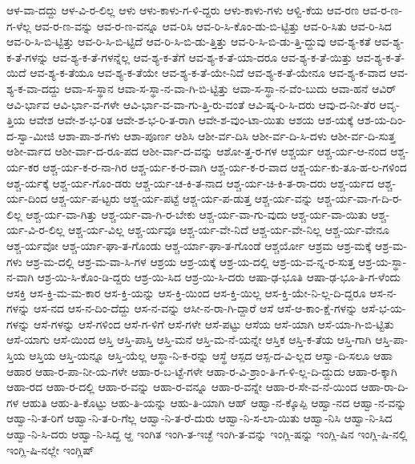 {ಆಳ-ವಾ-ದದ್ದು
ಆಳ-ವಿ-ರ-ಲಿಲ್ಲ
ಆಳು
ಆಳು-ಕಾಳು-ಗ-ಳಿ-ದ್ದರು
ಆಳು-ಕಾಳು-ಗಳು
ಆಳ್ವಿ-ಕೆಯ
ಆವ-ರಣ
ಆವ-ರ-ಣ-ಗ-ಳೆಲ್ಲ
ಆವ-ರ-ಣ-ವನ್ನು
ಆವ-ರ-ಣ-ವನ್ನೂ
ಆವ-ರಿಸಿ
ಆವ-ರಿ-ಸಿ-ಕೊಂ-ಡು-ಬಿ-ಟ್ಟಿತ್ತು
ಆವ-ರಿ-ಸಿತು
ಆವ-ರಿ-ಸಿದ
ಆವ-ರಿ-ಸಿ-ಬಿ-ಟ್ಟಿತ್ತು
ಆವ-ರಿ-ಸಿ-ಬಿ-ಟ್ಟಿದೆ
ಆವ-ರಿ-ಸಿ-ಬಿ-ಡು-ತ್ತಿತ್ತು
ಆವ-ರಿ-ಸಿ-ಬಿ-ಡು-ತ್ತಿ-ದ್ದುವು
ಆವ-ಶ್ಯ-ಕತೆ
ಆವ-ಶ್ಯ-ಕ-ತೆ-ಗಳನ್ನು
ಆವ-ಶ್ಯ-ಕ-ತೆ-ಗಳನ್ನೆಲ್ಲ
ಆವ-ಶ್ಯ-ಕ-ತೆಗೆ
ಆವ-ಶ್ಯ-ಕ-ತೆ-ಯಾ-ದರೂ
ಆವ-ಶ್ಯ-ಕ-ತೆ-ಯಿತ್ತು
ಆವ-ಶ್ಯ-ಕ-ತೆ-ಯಿದೆ
ಆವ-ಶ್ಯ-ಕ-ತೆಯೂ
ಆವ-ಶ್ಯ-ಕ-ತೆಯೇ
ಆವ-ಶ್ಯ-ಕ-ತೆ-ಯೇ-ನಿದೆ
ಆವ-ಶ್ಯ-ಕ-ತೆ-ಯೇನೂ
ಆವ-ಶ್ಯ-ಕ-ವಾದ
ಆವ-ಶ್ಯ-ಕ-ವಾ-ದದ್ದು
ಆವಾ-ಸ-ಸ್ಥಾನ
ಆವಾ-ಸ-ಸ್ಥಾ-ನ-ವಾ-ಗಿ-ಬಿ-ಟ್ಟಿತ್ತು
ಆವಾ-ಸ-ಸ್ಥಾ-ನ-ವೆಂ-ಬುದು
ಆವಾ-ಹನೆ
ಆವಿರ್
ಆವಿ-ರ್ಭಾವ
ಆವಿ-ರ್ಭಾ-ವ-ಗಳೇ
ಆವಿ-ರ್ಭಾ-ವ-ವಾ-ಗು-ತ್ತಿ-ರು-ವಂತೆ
ಆವಿ-ಷ್ಕ-ರಿ-ಸಿ-ದರು
ಆವು-ದ-ನೀ-ತೆರ
ಆವೃ-ತ್ತಿಯ
ಆವೇಶ
ಆವೇ-ಶ-ಭ-ರಿತ
ಆವೇ-ಶ-ಭ-ರಿ-ತ-ರಾಗಿ
ಆವೇ-ಶ-ವುಂ-ಟಾ-ಯಿತು
ಆಶಯ
ಆಶ-ಯಕ್ಕೆ
ಆಶ-ಯ-ದಿಂ-ದ-ಸ್ವಾ-ಮೀಜಿ
ಆಶಾ-ಪಾ-ಶ-ಗಳು
ಆಶಾ-ಪೂರ್ಣ
ಆಶಿಸಿ
ಆಶೀ-ರ್ವ-ದಿಸಿ
ಆಶೀ-ರ್ವ-ದಿ-ಸಿ-ದಳು
ಆಶೀ-ರ್ವ-ದಿ-ಸುತ್ತ
ಆಶೀ-ರ್ವಾದ
ಆಶೀ-ರ್ವಾ-ದ-ರೂ-ಪದ
ಆಶೀ-ರ್ವಾ-ದ-ವನ್ನು
ಆಶೋ-ತ್ತ-ರ-ಗಳ
ಆಶ್ಚರ್ಯ
ಆಶ್ಚ-ರ್ಯ-ಆ-ನಂದ
ಆಶ್ಚ-ರ್ಯ-ಕರ
ಆಶ್ಚ-ರ್ಯ-ಕ-ರ-ನಾ-ಗಿರ
ಆಶ್ಚ-ರ್ಯ-ಕ-ರ-ವಾಗಿ
ಆಶ್ಚ-ರ್ಯ-ಕ-ರ-ವಾದ
ಆಶ್ಚ-ರ್ಯ-ಕು-ತೂ-ಹ-ಲ-ಗಳಿಂದ
ಆಶ್ಚ-ರ್ಯಕ್ಕೆ
ಆಶ್ಚ-ರ್ಯ-ಗೊಂ-ಡರು
ಆಶ್ಚ-ರ್ಯ-ಚ-ಕಿ-ತ-ನಾದ
ಆಶ್ಚ-ರ್ಯ-ಚಿ-ಕಿ-ತ-ರಾ-ದರು
ಆಶ್ಚ-ರ್ಯದ
ಆಶ್ಚ-ರ್ಯ-ದಿಂದ
ಆಶ್ಚ-ರ್ಯ-ಪ-ಟ್ಟರು
ಆಶ್ಚ-ರ್ಯ-ಪಟ್ಟೆ
ಆಶ್ಚ-ರ್ಯ-ಪ-ಡುತ್ತ
ಆಶ್ಚ-ರ್ಯ-ವನ್ನು
ಆಶ್ಚ-ರ್ಯ-ವಾ-ಗ-ದಿ-ರ-ಲಿಲ್ಲ
ಆಶ್ಚ-ರ್ಯ-ವಾ-ಗಿತ್ತು
ಆಶ್ಚ-ರ್ಯ-ವಾ-ಗಿ-ರ-ಬೇಕು
ಆಶ್ಚ-ರ್ಯ-ವಾ-ಗು-ವುದು
ಆಶ್ಚ-ರ್ಯ-ವಾ-ಯಿತು
ಆಶ್ಚ-ರ್ಯ-ವಿ-ರ-ಲಿಲ್ಲ
ಆಶ್ಚ-ರ್ಯ-ವಿಲ್ಲ
ಆಶ್ಚ-ರ್ಯವೂ
ಆಶ್ಚ-ರ್ಯ-ವೇ-ನಿದೆ
ಆಶ್ಚ-ರ್ಯ-ವೇ-ನಿಲ್ಲ
ಆಶ್ಚ-ರ್ಯ-ವೇನೂ
ಆಶ್ಚ-ರ್ಯವೋ
ಆಶ್ಚ-ರ್ಯಾ-ಘಾ-ತ-ಗೊಂಡು
ಆಶ್ಚ-ರ್ಯಾ-ಘಾ-ತ-ಗೊಂಡೆ
ಆಶ್ಚರ್ಯೋ
ಆಶ್ರಮ
ಆಶ್ರ-ಮಕ್ಕೆ
ಆಶ್ರ-ಮ-ಗಳು
ಆಶ್ರ-ಮ-ದಲ್ಲಿ
ಆಶ್ರ-ಮ-ವಾ-ಸಿ-ಗಳ
ಆಶ್ರಯ
ಆಶ್ರ-ಯಕ್ಕೆ
ಆಶ್ರ-ಯ-ದಲ್ಲಿ
ಆಶ್ರ-ಯ-ವ-ನ್ನ-ರ-ಸುತ್ತ
ಆಶ್ರ-ಯ-ಸ್ಥಾ-ನ-ವಾಗಿ
ಆಶ್ರ-ಯಿ-ಸಿ-ಕೊಂ-ಡಿ-ದ್ದರು
ಆಶ್ರ-ಯಿ-ಸಿದ
ಆಶ್ರ-ಯಿ-ಸಿ-ದರು
ಆಷಾ-ಢ-ಭೂತಿ
ಆಷಾ-ಢ-ಭೂ-ತಿ-ಗ-ಳೆಂದು
ಆಸಕ್ತಿ
ಆಸ-ಕ್ತಿ-ಮ-ಮ-ಕಾರ
ಆಸ-ಕ್ತಿ-ಯನ್ನು
ಆಸ-ಕ್ತಿ-ಯಿಂದ
ಆಸ-ಕ್ತಿ-ಯಿಲ್ಲ
ಆಸ-ಕ್ತಿ-ಯೇ-ನಿ-ಲ್ಲ-ದಿ-ದ್ದರೂ
ಆಸ-ನ-ಗಳನ್ನು
ಆಸ-ನದ
ಆಸ-ನ-ದಿಂ-ದೆದ್ದು
ಆಸ-ನ-ವನ್ನು
ಆಸೀ-ನ-ರಾ-ಗಿ-ದ್ದಾರೆ
ಆಸೆ
ಆಸೆ-ಆ-ಕಾಂ-ಕ್ಷೆ-ಗಳನ್ನು
ಆಸೆ-ಭ-ಯ-ಗಳನ್ನು
ಆಸೆ-ಗಳನ್ನು
ಆಸೆ-ಗಳಿಂದ
ಆಸೆ-ಗ-ಳಿಗೆ
ಆಸೆ-ಗಳೇ
ಆಸೆ-ಪಟ್ಟು
ಆಸೆಯ
ಆಸೆ-ಯಾಗಿ
ಆಸೆ-ಯಾ-ಗಿ-ಬಿ-ಟ್ಟಿತು
ಆಸೆ-ಯಾಗು
ಆಸೆ-ಯಿಂದ
ಆಸ್ತಿ
ಆಸ್ತಿ-ಪಾಸ್ತಿ
ಆಸ್ತಿ-ಮನೆ
ಆಸ್ತಿ-ಮ-ನೆ-ಯನ್ನೇ
ಆಸ್ತಿಕ
ಆಸ್ತಿ-ಕ-ತೆಯ
ಆಸ್ತಿ-ಗಾಗಿ
ಆಸ್ತಿ-ಪಾ-ಸ್ತಿಯ
ಆಸ್ತಿಯ
ಆಸ್ತಿ-ಯನ್ನೂ
ಆಸ್ತಿ-ಯೆಲ್ಲ
ಆಸ್ಥಾ-ನಿ-ಕ-ರನ್ನು
ಆಸ್ಥೆ
ಆಸ್ಪದ
ಆಸ್ಪ-ದ-ವಿ-ಲ್ಲದ
ಆಸ್ವಾ-ದಿ-ಸಲೂ
ಆಹಾ
ಆಹಾರ
ಆಹಾ-ರ-ಪಾ-ನೀ-ಯ-ಗಳೇ
ಆಹಾ-ರ-ಬ-ಟ್ಟೆ-ಗಳೇ
ಆಹಾ-ರ-ವಿ-ಶ್ರಾಂ-ತಿ-ಗ-ಳಿ-ಲ್ಲ-ದಿ-ದ್ದುದು
ಆಹಾ-ರ-ಕ್ಕಾಗಿ
ಆಹಾ-ರದ
ಆಹಾ-ರ-ದಲ್ಲಿ
ಆಹಾ-ರ-ವನ್ನು
ಆಹಾ-ರ-ವನ್ನೂ
ಆಹಾ-ರ-ವನ್ನೇ
ಆಹಾ-ರ-ಸೇ-ವ-ನೆ-ಯಿಂದ
ಆಹಾ-ರಾ-ದಿ-ಗಳ
ಆಹುತಿ
ಆಹು-ತಿ-ಕೊಟ್ಟು
ಆಹು-ತಿ-ಯನ್ನು
ಆಹು-ತಿ-ಯಾಗಿ
ಆಹ್
ಆಹ್ವಾ-ನ-ಕ್ಕೊಪ್ಪಿ
ಆಹ್ವಾ-ನದ
ಆಹ್ವಾ-ನ-ವನ್ನು
ಆಹ್ವಾ-ನಿ-ತ-ರಿಗೆ
ಆಹ್ವಾ-ನಿ-ತ-ರಿ-ಗೆಲ್ಲ
ಆಹ್ವಾ-ನಿ-ತ-ರೆ-ದುರು
ಆಹ್ವಾ-ನಿ-ಸ-ಲಾ-ಯಿತು
ಆಹ್ವಾ-ನಿಸಿ
ಆಹ್ವಾ-ನಿ-ಸಿದ
ಆಹ್ವಾ-ನಿ-ಸಿ-ದರು
ಆಹ್ವಾ-ನಿ-ಸಿದ್ದ
ಆ್ಹ
ಇಂಗಿತ
ಇಂಗಿ-ತ-ಇಚ್ಛೆ
ಇಂಗಿ-ತ-ವನ್ನು
ಇಂಗ್ಲಿ-ಷನ್ನು
ಇಂಗ್ಲಿ-ಷಿನ
ಇಂಗ್ಲಿ-ಷಿ-ನಲ್ಲಿ
ಇಂಗ್ಲಿ-ಷಿ-ನಲ್ಲೇ
ಇಂಗ್ಲಿಷ್
}
